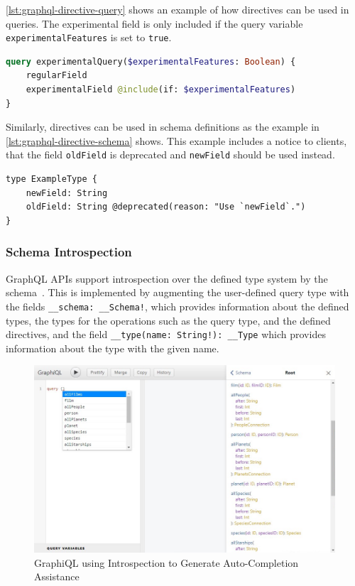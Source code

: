 \autoref{lst:graphql-directive-query} shows an example of how directives can be used in queries.
The experimental field is only included if the query variable \texttt{experimentalFeatures} is set to \texttt{true}.

\begin{lstlisting}[caption={Usage of a Directive in a GraphQL Query}, language=graphql, label={lst:graphql-directive-query}]
query experimentalQuery($experimentalFeatures: Boolean) {
    regularField
    experimentalField @include(if: $experimentalFeatures)
}
\end{lstlisting}

Similarly, directives can be used in schema definitions as the example in \autoref{lst:graphql-directive-schema} shows.
This example includes a notice to clients, that the field \texttt{oldField} is deprecated and \texttt{newField} should be used instead.

\begin{lstlisting}[caption={Usage of a Directive in a GraphQL Schema~\cite{Facebook2018}}, language=graphqls, label={lst:graphql-directive-schema}]
type ExampleType {
    newField: String
    oldField: String @deprecated(reason: "Use `newField`.")
}
\end{lstlisting}

\subsubsection{Schema Introspection}

GraphQL \acp{API} support introspection over the defined type system by the schema~\cite{Facebook2018}.
This is implemented by augmenting the user-defined query type with the fields \texttt{\_\_schema: \_\_Schema!}, which provides information about the defined types, the types for the operations such as the query type, and the defined directives, and the field \texttt{\_\_type(name: String!): \_\_Type} which provides information about the type with the given name.%

\begin{figure}[htb!]
    \includegraphics[width=\textwidth]{images/graphiql-autocomplete.png}
    \caption{GraphiQL using Introspection to Generate Auto-Completion Assistance}\label{img:graphiql-introspection}
\end{figure}

